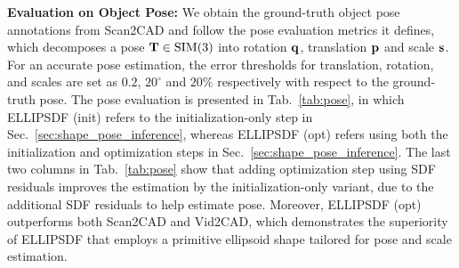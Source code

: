 
\begin{table}[t]
\centering
\caption{Quantitative results for pose estimation on ScanNet~\cite{dai2017scannet}.}
    \label{tab:pose}
\end{table}

{\vspace{1ex}\bf \noindent Evaluation on Object Pose: }%
We obtain the ground-truth object pose annotations from Scan2CAD \cite{avetisyan2019scan2cad} and follow the pose evaluation metrics it defines, which decomposes a pose $\mathbf{T} \in \text{SIM}(3)$ into rotation $\mathbf{q}$, translation $\mathbf{p}$ and scale $\mathbf{s}$. For an accurate pose estimation, the error thresholds for translation, rotation, and scales are set as $0.2$, $20^{\circ}$ and $20\%$ respectively with respect to the ground-truth pose.
The pose evaluation is presented in Tab.~\ref{tab:pose}, in which ELLIPSDF (init) refers to the initialization-only step in Sec.~\ref{sec:shape_pose_inference}, whereas ELLIPSDF (opt) refers using both the initialization and optimization steps in Sec.~\ref{sec:shape_pose_inference}.
The last two columns in Tab.~\ref{tab:pose} show that adding optimization step using SDF residuals improves the estimation by the initialization-only variant, due to the additional SDF residuals to help estimate pose. 
Moreover, ELLIPSDF (opt) outperforms both Scan2CAD and Vid2CAD, which demonstrates the superiority of ELLIPSDF that employs a primitive ellipsoid shape tailored for pose and scale estimation.

